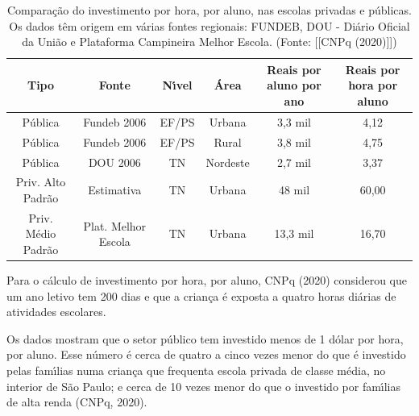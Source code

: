 \documentclass[
12pt,		%
openright,	%
twoside,  %
a4paper,			%
chapter=TITLE,		%
english,			%
french,				%
spanish,			%
brazil				%
]{USPSC-classe/USPSC}
\begin{document}
\begin{table}[htb]
\tiny
\caption{\label{489af209007e651b007535a7733d5ca117c5b310}Compara\c{c}\~ao do investimento por hora, por aluno, nas escolas privadas e p\'ublicas. Os dados t\^em origem em v\'arias fontes regionais: FUNDEB, DOU - Di\'ario Oficial da Uni\~ao e Plataforma Campineira Melhor Escola. (Fonte:  [[CNPq (2020)]])}

\centering
\begin{tabular}{|c|c|c|c|c|c|}
\hline
Tipo  &  Fonte  &  N\'{\i}vel  &  \'Area  &  Reais por aluno por ano  &  Reais por hora por aluno \\
\hline
P\'ublica  &  Fundeb 2006  &  EF/PS  &  Urbana  &  3,3 mil  &  4,12 \\
P\'ublica  &  Fundeb 2006  &  EF/PS  &  Rural  &  3,8 mil  &  4,75 \\
P\'ublica  &  DOU 2006  &  TN  &  Nordeste  &  2,7 mil  &  3,37 \\
Priv. Alto Padr\~ao  &  Estimativa  &  TN  &  Urbana  &  48 mil  &  60,00 \\
Priv. M\'edio Padr\~ao  &  Plat. Melhor Escola  &  TN  &  Urbana  &  13,3 mil  &  16,70 \\
\hline
\end{tabular}
\end{table}


Para o c\'alculo de investimento por hora, por aluno,  CNPq (2020) considerou que um ano letivo tem 200 dias e que a crian\c{c}a \'e exposta a quatro horas di\'arias de atividades escolares.








Os dados mostram que o setor p\'ublico tem investido menos de 1 d\'olar por hora, por aluno. Esse n\'umero \'e cerca de quatro a cinco vezes menor do que \'e investido pelas fam\'{\i}lias numa crian\c{c}a que frequenta escola privada de classe m\'edia, no interior de S\~ao Paulo; e cerca de 10 vezes menor do que o investido por fam\'{\i}lias de alta renda  (CNPq, 2020).









\noindent\begin{center}\mbox{\centering{}}\end{center}
\end{document}
